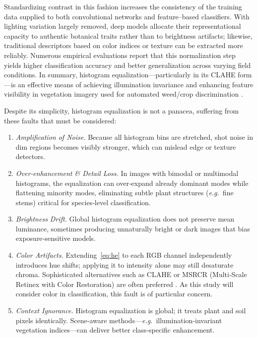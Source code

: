 \documentclass[letterpaper, notitlepage]{report}
\begin{document}
Standardizing contrast in this fashion increases the consistency of the training data supplied to both convolutional networks and feature--based classifiers. With lighting variation largely removed, deep models allocate their representational capacity to authentic botanical traits rather than to brightness artifacts; likewise, traditional descriptors based on color indices or texture can be extracted more reliably. Numerous empirical evaluations report that this normalization step yields higher classification accuracy and better generalization across varying field conditions. In summary, histogram equalization---particularly in its \gls{CLAHE} form---is an effective means of achieving illumination invariance and enhancing feature visibility in vegetation imagery used for automated weed/crop discrimination \parencite{Reza2004-cb}.

Despite its simplicity, histogram equalization is not a panacea, suffering from these faults that must be considered:

\begin{enumerate}[label=(\alph*)]
    \item \emph{Amplification of Noise.}  Because all histogram bins are stretched, shot noise in dim regions becomes visibly stronger, which can mislead edge or texture detectors.
    \item \emph{Over‐enhancement \& Detail Loss.}  In images with bimodal or multimodal histograms, the equalization can over‐expand already dominant modes while flattening minority modes, eliminating subtle plant structures (\textit{e.g.}\ fine stems) critical for species‐level classification.
    \item \emph{Brightness Drift.}  Global histogram equalization does not preserve mean luminance, sometimes producing unnaturally bright or dark images that bias exposure‐sensitive models.
    \item \emph{Color Artifacts.}  Extending~\eqref{eq:he} to each RGB channel independently introduces hue shifts; applying it to intensity alone may still desaturate chroma.  Sophisticated alternatives such as CLAHE or MSRCR (Multi‐Scale Retinex with Color Restoration) are often preferred \parencite{Pizer1987-kd, Jobson1997-jk}. As this study will consider color in classification, this fault is of particular concern.
    \item \emph{Context Ignorance.}  Histogram equalization is global; it treats plant and soil pixels identically.  Scene‐aware methods—\textit{e.g.}\ illumination‐invariant vegetation indices—can deliver better class‐specific enhancement.
\end{enumerate}
\end{document}
